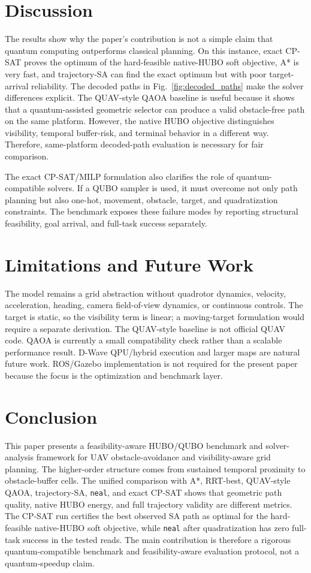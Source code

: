 \documentclass[10pt,conference]{IEEEtran}
\begin{document}
\section{Discussion}
The results show why the paper's contribution is not a simple claim that quantum computing outperforms classical planning. On this instance, exact CP-SAT proves the optimum of the hard-feasible native-HUBO soft objective, A* is very fast, and trajectory-SA can find the exact optimum but with poor target-arrival reliability. The decoded paths in Fig.~\ref{fig:decoded_paths} make the solver differences explicit. The QUAV-style QAOA baseline is useful because it shows that a quantum-assisted geometric selector can produce a valid obstacle-free path on the same platform. However, the native HUBO objective distinguishes visibility, temporal buffer-risk, and terminal behavior in a different way. Therefore, same-platform decoded-path evaluation is necessary for fair comparison.

The exact CP-SAT/MILP formulation also clarifies the role of quantum-compatible solvers. If a QUBO sampler is used, it must overcome not only path planning but also one-hot, movement, obstacle, target, and quadratization constraints. The benchmark exposes these failure modes by reporting structural feasibility, goal arrival, and full-task success separately.

\section{Limitations and Future Work}
The model remains a grid abstraction without quadrotor dynamics, velocity, acceleration, heading, camera field-of-view dynamics, or continuous controls. The target is static, so the visibility term is linear; a moving-target formulation would require a separate derivation. The QUAV-style baseline is not official QUAV code. QAOA is currently a small compatibility check rather than a scalable performance result. D-Wave QPU/hybrid execution and larger maps are natural future work. ROS/Gazebo implementation is not required for the present paper because the focus is the optimization and benchmark layer.

\section{Conclusion}
This paper presents a feasibility-aware HUBO/QUBO benchmark and solver-analysis framework for UAV obstacle-avoidance and visibility-aware grid planning. The higher-order structure comes from sustained temporal proximity to obstacle-buffer cells. The unified comparison with A*, RRT-best, QUAV-style QAOA, trajectory-SA, \texttt{neal}, and exact CP-SAT shows that geometric path quality, native HUBO energy, and full trajectory validity are different metrics. The CP-SAT run certifies the best observed SA path as optimal for the hard-feasible native-HUBO soft objective, while \texttt{neal} after quadratization has zero full-task success in the tested reads. The main contribution is therefore a rigorous quantum-compatible benchmark and feasibility-aware evaluation protocol, not a quantum-speedup claim.
\end{document}
